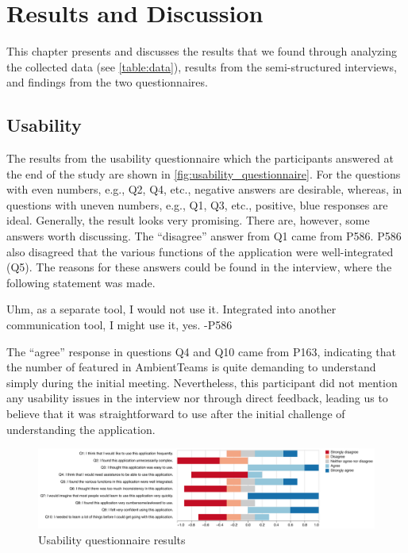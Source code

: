 \chapter{Results and Discussion}
\label{chapter:results_and_discussion}

This chapter presents and discusses the results that we found through analyzing the collected data (see \autoref{table:data}), results from the semi-structured interviews, and findings from the two questionnaires.

\section{Usability}
\label{section:usability}

The results from the usability questionnaire which the participants answered at the end of the study are shown in \autoref{fig:usability_questionnaire}. For the questions with even numbers, e.g., Q2, Q4, etc., negative answers are desirable, whereas, in questions with uneven numbers, e.g., Q1, Q3, etc., positive, blue responses are ideal. Generally, the result looks very promising. There are, however, some answers worth discussing. The \enquote{disagree} answer from Q1 came from P586. P586 also disagreed that the various functions of the application were well-integrated (Q5). The reasons for these answers could be found in the interview, where the following statement was made.

\begin{displayquote}
    Uhm, as a separate tool, I would not use it. Integrated into another communication tool, I might use it, yes. -P586
\end{displayquote}

The \enquote{agree} response in questions Q4 and Q10 came from P163, indicating that the number of featured in AmbientTeams is quite demanding to understand simply during the initial meeting. Nevertheless, this participant did not mention any usability issues in the interview nor through direct feedback, leading us to believe that it was straightforward to use after the initial challenge of understanding the application.

\begin{figure}[h]
    \centering
    \includegraphics[width=\linewidth]{plots/usability_likert.pdf}
    \caption{Usability questionnaire results}
    \label{fig:usability_questionnaire}
\end{figure}

